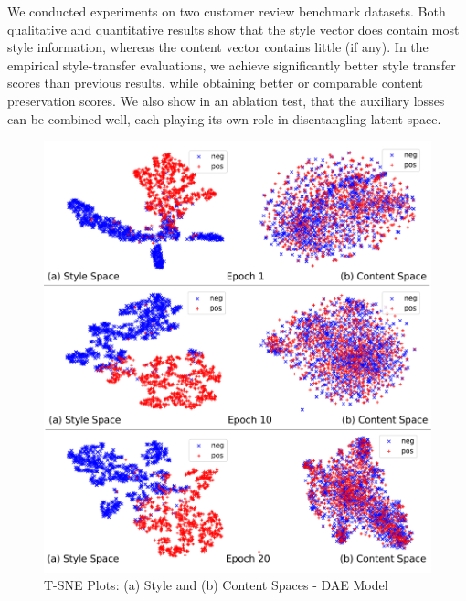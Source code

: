 \documentclass[11pt,a4paper]{article}
\begin{document}
We conducted experiments on two customer review benchmark datasets. Both qualitative and quantitative results show that the style vector does contain most style information, whereas the content vector contains little (if any). In the empirical style-transfer evaluations, we achieve significantly better style transfer scores than previous results, while obtaining better or comparable content preservation scores.  We also show in an ablation test, that the auxiliary losses can be combined well, each playing its own role in disentangling latent space.


\begin{figure}[ht]
	\captionsetup{justification=centering}
	\includegraphics[width=\linewidth]{latent-spaces-dae}
	\caption{T-SNE Plots: (a) Style and (b) Content Spaces - DAE Model}
	\label{fig:dae-tsne}
\end{figure}
\end{document}

